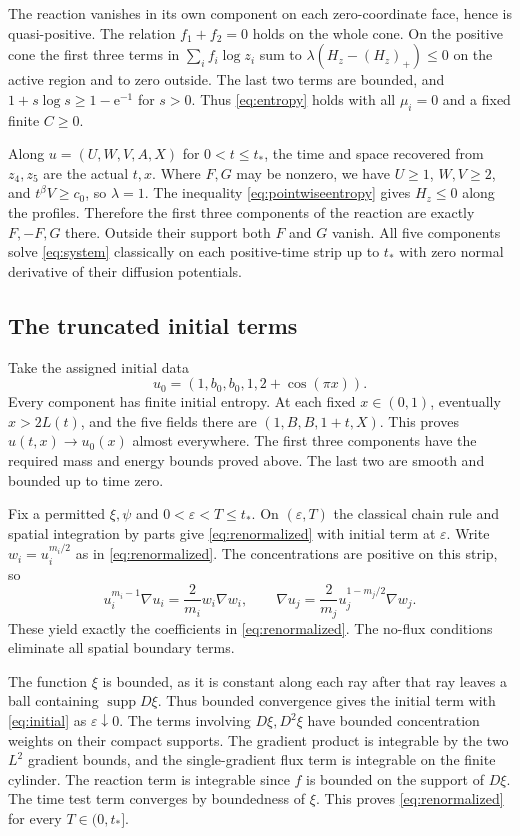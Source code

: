 \documentclass[11pt]{article}
\begin{document}
The reaction vanishes in its own component on each zero-coordinate
face, hence is quasi-positive. The relation \(f_1+f_2=0\) holds on the
whole cone. On the positive cone the first three terms in
\(\sum_i f_i\log z_i\) sum to \(\lambda(H_z-(H_z)_+)\le0\) on
the active region and to zero outside. The last two terms are
bounded, and \(1+s\log s\ge1-\mathrm e^{-1}\) for \(s>0\). Thus
\eqref{eq:entropy} holds with all \(\mu_i=0\) and a fixed finite
\(C\ge0\).

Along \(u=(U,W,V,A,X)\) for \(0<t\le t_*\), the time and space recovered
from \(z_4,z_5\) are the actual \(t,x\). Where \(F,G\) may be nonzero,
we have \(U\ge1\), \(W,V\ge2\), and \(t^\beta V\ge c_0\), so
\(\lambda=1\). The inequality \eqref{eq:pointwiseentropy} gives
\(H_z\le0\) along the profiles. Therefore the first three components
of the reaction are exactly \(F,-F,G\) there. Outside their support
both \(F\) and \(G\) vanish. All five components solve
\eqref{eq:system} classically on each positive-time strip up to \(t_*\)
with zero normal derivative of their diffusion potentials.

\subsection{The truncated initial terms}

Take the assigned initial data
\begin{equation}
 u_0=(1,b_0,b_0,1,2+\cos(\pi x)).
 \label{eq:initial}
\end{equation}
Every component has finite initial entropy. At each fixed
\(x\in(0,1)\), eventually \(x>2L(t)\), and the five fields there are
\((1,B,B,1+t,X)\). This proves \(u(t,x)\to u_0(x)\) almost everywhere.
The first three components have the required mass and energy bounds
proved above. The last two are smooth and bounded up to time zero.

Fix a permitted \(\xi,\psi\) and \(0<\varepsilon<T\le t_*\).
On \((\varepsilon,T)\) the classical chain rule and spatial
integration by parts give \eqref{eq:renormalized} with initial term
at \(\varepsilon\). Write \(w_i=u_i^{m_i/2}\) as in
\eqref{eq:renormalized}. The concentrations are positive on this strip, so
\[
 u_i^{m_i-1}\nabla u_i=\frac{2}{m_i}w_i\nabla w_i,\qquad
 \nabla u_j=\frac{2}{m_j}u_j^{1-m_j/2}\nabla w_j .
\]
These yield exactly the coefficients in \eqref{eq:renormalized}.
The no-flux conditions eliminate all spatial boundary terms.

The function \(\xi\) is bounded, as it is constant along each ray
after that ray leaves a ball containing \(\operatorname{supp} D\xi\).
Thus bounded convergence gives the initial term with \eqref{eq:initial}
as \(\varepsilon\downarrow0\). The terms involving \(D\xi,D^2\xi\)
have bounded concentration weights on their compact supports.
The gradient product is integrable by the two \(L^2\) gradient
bounds, and the single-gradient flux term is integrable on the finite
cylinder. The reaction term is integrable since \(f\) is bounded on the
support of \(D\xi\). The time test term converges by boundedness of
\(\xi\). This proves \eqref{eq:renormalized} for every
\(T\in(0,t_*]\).
\end{document}
